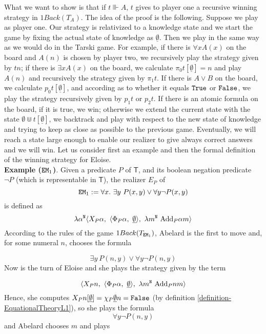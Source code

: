 \documentclass[copyright,creativecommons]{eptcs}
\newcommand{\EM}                       { {\tt EM} }
\newcommand{\Nat}                      { {\tt N} }
\newcommand{\SystemT}                  {\mathsf{T}}
\newcommand{\True}                     { {\tt{True}} }
\newcommand{\False}                    { {\tt{False}} }
\newcommand{\proj}                     { {p} }
\newcommand{\Add}                      { {\mbox{Add}} }
\newcommand{\makestate}      [1]       { {\underline{#1}} }
\begin{document}
What we want to show is that if $t\Vvdash A$,
$t$ gives to player one a recursive winning strategy in
$1Back(T_A)$. The idea of the proof is the following. Suppose we play as player one. Our strategy is relativized to a knowledge state and we start
the game by fixing the actual state of knowledge as $\makestate{\emptyset}$.
Then we play in the same way as we would do in the Tarski game. For
example,  if there is $\forall x A(x)$ on the board and
$A(n)$ is chosen by player two, we recursively play the
strategy given by $tn$; if there is $\exists x A(x)$ on the
board, we calculate $\pi_0t[\makestate{\emptyset}]=n$ and play
$A(n)$ and recursively the strategy given by $\pi_1t$. If there is $A\lor B$ on the board, we calculate $\proj_0t[\makestate{\emptyset}]$, and according as to whether it equals $\True$ or $\False$, we play the strategy recursively given by $\proj_1t$ or $\proj_2t$.
If there is an atomic formula on the board, if it is true, we win; otherwise we extend the current state with the state $\emptyset \Cup t[\makestate{\emptyset}]$, we backtrack and play with respect to the new state of knowledge and trying to keep as close as possible to the previous game.
Eventually, we will reach a state large enough to enable our
realizer to give always correct answers and we will win. Let us consider first an example and then the formal definition of the winning strategy for Eloise.\\


\textbf{Example ($\EM_1$)}. Given a predicate $P$ of $\SystemT$, and its boolean negation predicate $\neg P$ (which is representable in $\SystemT$), the realizer $E_P$ of  \[\EM_1:=\forall x.\ \exists y\
P(x, y)\vee \forall y \neg P(x,y)\]
  is defined as \[\lambda \alpha^{\Nat}
\langle  X_P\alpha,\ \langle
\Phi_P{\alpha},\
\makestate{\emptyset} \rangle ,\ \lambda m^{\Nat}\
\Add_P {\alpha}m\rangle   \]
According to the rules of the game $1Back(T_{\EM_1})$, Abelard is the first to move and, for some numeral $n$, chooses the formula

\[\exists y\ P(n, y)\vee \forall y \neg P(n,y)\]
Now is the turn of Eloise 
and she plays the strategy given by the term

\[\langle  X_Pn,\ \langle
\Phi_P{\alpha},\
\makestate{\emptyset} \rangle ,\ \lambda m^{\Nat}\
\Add_P nm\rangle   \]
Hence, she computes $X_Pn[\makestate{\emptyset}]=\chi_P\makestate{\emptyset} n=\False$ (by definition \ref{definition-EquationalTheoryL1}), so she plays the formula 
\[\forall y \neg P(n,y)\]
and Abelard chooses $m$ and plays 
\end{document}
